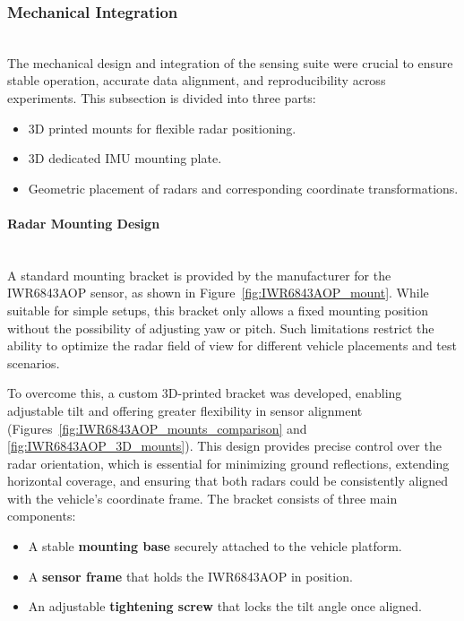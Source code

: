 \vspace{0.5em}
\subsubsection{Mechanical Integration}
\hfill
\\
\indent The mechanical design and integration of the sensing suite were crucial to ensure stable operation, accurate data alignment, and reproducibility across experiments. 
This subsection is divided into three parts:
\begin{itemize}
    \item 3D printed mounts for flexible radar positioning.  
    \item 3D dedicated IMU mounting plate.  
    \item Geometric placement of radars and corresponding coordinate transformations.  
\end{itemize}

\vspace{0.5em}
\paragraph{Radar Mounting Design}
\hfill
\\
\indent A standard mounting bracket is provided by the manufacturer for the IWR6843AOP sensor, as shown in Figure~\ref{fig:IWR6843AOP_mount}. 
While suitable for simple setups, this bracket only allows a fixed mounting position without the possibility of adjusting yaw or pitch. 
Such limitations restrict the ability to optimize the radar field of view for different vehicle placements and test scenarios.  

To overcome this, a custom 3D-printed bracket was developed, enabling adjustable tilt and offering greater flexibility in sensor alignment (Figures~\ref{fig:IWR6843AOP_mounts_comparison} and \ref{fig:IWR6843AOP_3D_mounts}). 
This design provides precise control over the radar orientation, which is essential for minimizing ground reflections, extending horizontal coverage, and ensuring that both radars could be consistently aligned with the vehicle’s coordinate frame.  
\newpage
The bracket consists of three main components:  
\begin{itemize}
    \item A stable \textbf{mounting base} securely attached to the vehicle platform.  
    \item A \textbf{sensor frame} that holds the IWR6843AOP in position.  
    \item An adjustable \textbf{tightening screw} that locks the tilt angle once aligned.  
\end{itemize}

